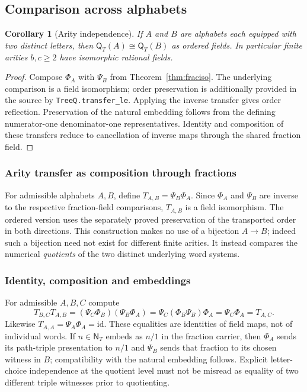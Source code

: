 \documentclass[11pt,reqno]{amsart}
\newtheorem{corollary}[theorem]{Corollary}
\theoremstyle{definition}\newtheorem{definition}[theorem]{Definition}
\theoremstyle{remark}\newtheorem{remark}[theorem]{Remark}
\newcommand{\N}{\mathsf N_T}\newcommand{\Z}{\mathsf Z_T}\newcommand{\Q}{\mathsf Q_T}\newcommand{\RR}{\mathsf R}
\begin{document}
\subsection{Comparison across alphabets}\label{main:sub-20}
\begin{corollary}[Arity independence]\label{cor:arity}
If $A$ and $B$ are alphabets each equipped with two distinct letters, then
$\Q(A)\cong\Q(B)$ as ordered fields. In particular finite arities $b,c\ge2$ have isomorphic rational fields.
\end{corollary}
\begin{proof}
Compose $\Phi_A$ with $\Psi_B$ from Theorem~\ref{thm:fraciso}. The underlying comparison is a field isomorphism; order preservation is additionally provided in the source by \texttt{TreeQ.transfer\_le}. Applying the inverse transfer gives order reflection. Preservation of the natural embedding follows from the defining numerator-one denominator-one representatives. Identity and composition of these transfers reduce to cancellation of inverse maps through the shared fraction field.
\end{proof}

\medskip
\subsubsection*{Arity transfer as composition through fractions}\label{supp:7-1}
For admissible alphabets $A,B$, define $T_{A,B}=\Psi_B\Phi_A$. Since $\Phi_A$ and $\Psi_B$ are inverse to the respective fraction-field comparisons, $T_{A,B}$ is a field isomorphism. The ordered version uses the separately proved preservation of the transported order in both directions. This construction makes no use of a bijection $A\to B$; indeed such a bijection need not exist for different finite arities. It instead compares the numerical \emph{quotients} of the two distinct underlying word systems.
\medskip
\medskip
\subsubsection*{Identity, composition and embeddings}\label{supp:7-2}
For admissible $A,B,C$ compute
\[
T_{B,C}T_{A,B}=(\Psi_C\Phi_B)(\Psi_B\Phi_A)=\Psi_C(\Phi_B\Psi_B)\Phi_A=\Psi_C\Phi_A=T_{A,C}.
\]
Likewise $T_{A,A}=\Psi_A\Phi_A=\mathrm{id}$. These equalities are identities of field maps, not of individual words. If $n\in\N$ embeds as $n/1$ in the fraction carrier, then $\Phi_A$ sends its path-triple presentation to $n/1$ and $\Psi_B$ sends that fraction to its chosen witness in $B$; compatibility with the natural embedding follows. Explicit letter-choice independence at the quotient level must not be misread as equality of two different triple witnesses prior to quotienting.
\medskip
\end{document}

